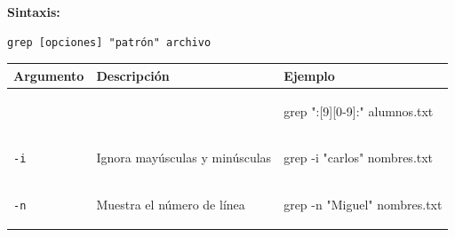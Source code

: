 \documentclass[
  spanish,
  12pt,
  letterpaper,
  DIV=11,
  numbers=noendperiod]{scrreprt}
\newenvironment{Shaded}{\begin{snugshade}}{\end{snugshade}}
\newcommand{\AttributeTok}[1]{\textcolor[rgb]{0.40,0.45,0.13}{#1}}
\newcommand{\FunctionTok}[1]{\textcolor[rgb]{0.28,0.35,0.67}{#1}}
\newcommand{\NormalTok}[1]{\textcolor[rgb]{0.00,0.23,0.31}{#1}}
\newcommand{\StringTok}[1]{\textcolor[rgb]{0.13,0.47,0.30}{#1}}
\newcounter{none} %
\begin{document}
\textbf{Sintaxis:}

\begin{verbatim}
grep [opciones] "patrón" archivo
\end{verbatim}

{\def\LTcaptype{none} %
\begin{longtable}[]{@{}
  >{\raggedright\arraybackslash}p{}
  >{\raggedright\arraybackslash}p{}
  >{\raggedright\arraybackslash}p{}@{}}
\toprule\noalign{}
\begin{minipage}[b]{\linewidth}\raggedright
Argumento
\end{minipage} & \begin{minipage}[b]{\linewidth}\raggedright
Descripción
\end{minipage} & \begin{minipage}[b]{\linewidth}\raggedright
Ejemplo
\end{minipage} \\
\midrule\noalign{}
\endhead
\bottomrule\noalign{}
\endlastfoot
& & \begin{minipage}[t]{\linewidth}\raggedright
\begin{Shaded}
\begin{Highlighting}[]
\FunctionTok{grep} \StringTok{":[9][0{-}9]:"}\NormalTok{ alumnos.txt}
\end{Highlighting}
\end{Shaded}
\end{minipage} \\
\texttt{-i} & Ignora mayúsculas y minúsculas &
\begin{minipage}[t]{\linewidth}\raggedright
\begin{Shaded}
\begin{Highlighting}[]
\FunctionTok{grep} \AttributeTok{{-}i} \StringTok{"carlos"}\NormalTok{ nombres.txt}
\end{Highlighting}
\end{Shaded}
\end{minipage} \\
\texttt{-n} & Muestra el número de línea &
\begin{minipage}[t]{\linewidth}\raggedright
\begin{Shaded}
\begin{Highlighting}[]
\FunctionTok{grep} \AttributeTok{{-}n} \StringTok{"Miguel"}\NormalTok{ nombres.txt}
\end{Highlighting}
\end{Shaded}

\end{minipage}
\end{longtable}}
\end{document}
